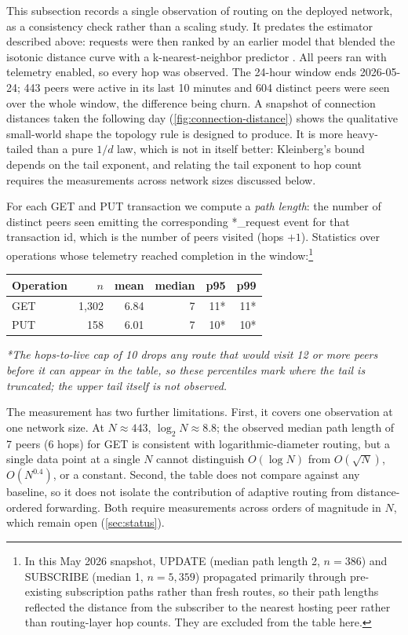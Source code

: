 

This subsection records a single observation of routing on the deployed network, as a consistency check rather than a scaling study. It predates the estimator described above: requests were then ranked by an earlier model that blended the isotonic distance curve with a k-nearest-neighbor predictor \citep{renegade}. All peers ran with telemetry enabled, so every hop was observed. The 24-hour window ends 2026-05-24; 443 peers were active in its last 10 minutes and 604 distinct peers were seen over the whole window, the difference being churn. A snapshot of connection distances taken the following day (\cref{fig:connection-distance}) shows the qualitative small-world shape the topology rule is designed to produce. It is more heavy-tailed than a pure $1/d$ law, which is not in itself better: Kleinberg's bound depends on the tail exponent, and relating the tail exponent to hop count requires the measurements across network sizes discussed below.

For each \textsf{GET} and \textsf{PUT} transaction we compute a \emph{path length}: the number of distinct peers seen emitting the corresponding \textsf{*\_request} event for that transaction id, which is the number of peers visited (hops $+ 1$). Statistics over operations whose telemetry reached completion in the window:\footnote{In this May 2026 snapshot, \textsf{UPDATE} (median path length 2, $n = 386$) and \textsf{SUBSCRIBE} (median 1, $n = 5{,}359$) propagated primarily through pre-existing subscription paths rather than fresh routes, so their path lengths reflected the distance from the subscriber to the nearest hosting peer rather than routing-layer hop counts. They are excluded from the table here.}

\begin{center}
\small
\begin{tabular}{lrrrrr}
\toprule
Operation & $n$ & mean & median & p95 & p99 \\
\midrule
\textsf{GET} & 1{,}302 & 6.84 & 7 & 11* & 11* \\
\textsf{PUT} &    158 & 6.01 & 7 & 10* & 10* \\
\bottomrule
\end{tabular}
\end{center}

\noindent\textit{*The hops-to-live cap of 10 drops any route that would visit 12 or more peers before it can appear in the table, so these percentiles mark where the tail is truncated; the upper tail itself is not observed.}

The measurement has two further limitations. First, it covers one observation at one network size. At $N \approx 443$, $\log_2 N \approx 8.8$; the observed median path length of 7 peers (6 hops) for \textsf{GET} is consistent with logarithmic-diameter routing, but a single data point at a single $N$ cannot distinguish $O(\log N)$ from $O(\sqrt{N})$, $O(N^{0.4})$, or a constant. Second, the table does not compare against any baseline, so it does not isolate the contribution of adaptive routing from distance-ordered forwarding. Both require measurements across orders of magnitude in $N$, which remain open (\cref{sec:status}).

